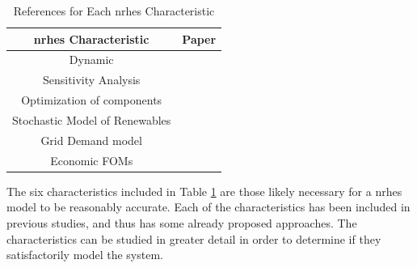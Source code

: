 \begin{table}[h!]
\centering
\caption{References for Each \ac{nrhes} Characteristic}
\begin{tabular}{ ||c | c|| }
 \hline
 \ac{nrhes} Characteristic & Paper \\ [0.5ex]
 \hline \hline
 Dynamic & \cite{Garcia2013, Du2014, Kazimi, Garcia2016}\\
 \hline
 Sensitivity Analysis & \cite{Shropshire2011, Rehman2010, Adaramola2014, Chen2016}\\
 \hline
 Optimization of components & \cite{Chen2016,Ozcan2016, Forsberg2009,Garcia2015,Aumeier2011}\\
 \hline
 Stochastic Model of Renewables & \cite{Rabiti2015, Garcia2016,Locatelli2015}\\
 \hline
 Grid Demand model & \cite{Forsberg2013, Garcia2016,Garcia2013,Ruth2014,Chen2016}\\
 \hline
  Economic FOMs & \cite{Garcia2016,Chen2016,Rabiti2015,Epiney2016,Bragg-Sitton2014}\\
 \hline
\end{tabular}
\label{table:1}
\end{table}

The six characteristics included in Table \ref{table:1} are those likely necessary for a \ac{nrhes} model to be reasonably accurate.  Each of the characteristics has been included in previous studies, and thus has some already proposed approaches.  The characteristics can be studied in greater detail in order to determine if they satisfactorily model the system.
